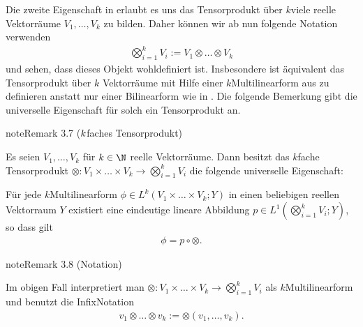 \documentclass[letterpaper,10pt,german]{jupyterBook}
\begin{document}
\sphinxAtStartPar
Die zweite Eigenschaft in {\hyperref[\detokenize{vektoranalysis/tensor:lem:natISO}]{}} erlaubt es uns das Tensorprodukt über \(k\)\sphinxhyphen{}viele reelle Vektorräume \(V_1,\ldots, V_k\) zu bilden.
Daher können wir ab nun folgende Notation verwenden
\begin{equation*}
\begin{split}\bigotimes_{i=1}^k V_i :=V_1\otimes\ldots\otimes V_k\end{split}
\end{equation*}
\sphinxAtStartPar
und sehen, dass dieses Objekt wohldefiniert ist.
Insbesondere ist äquivalent das Tensorprodukt über \(k\) Vektorräume mit Hilfe einer \(k\)\sphinxhyphen{}Multilinearform aus {\hyperref[\detokenize{vektoranalysis/multilinear:s-k-multilinearform}]{}} zu definieren anstatt nur einer Bilinearform wie in {\hyperref[\detokenize{vektoranalysis/tensor:def:tensor}]{}}.
Die folgende Bemerkung gibt die universelle Eigenschaft für solch ein Tensorprodukt an.
\label{vektoranalysis/tensor:rem:kfachesTensorprodukt}
\begin{sphinxadmonition}{note}{Remark 3.7 (\protect\(k\protect\)\sphinxhyphen{}faches Tensorprodukt)}



\sphinxAtStartPar
Es seien \(V_1,\ldots, V_k\) für \(k \in \N\) reelle Vektorräume.
Dann besitzt das \(k\)\sphinxhyphen{}fache Tensorprodukt \(\otimes \colon V_1 \times \ldots \times V_k \rightarrow \bigotimes_{i=1}^k V_i\) die folgende universelle Eigenschaft:

\sphinxAtStartPar
Für jede \(k\)\sphinxhyphen{}Multilinearform \(\phi\in L^k(V_1\times\ldots\times V_k; Y)\) in einen beliebigen reellen Vektorraum \(Y\) existiert eine eindeutige lineare Abbildung
\(p \in L^1(\bigotimes_{i=1}^k V_i; Y)\), so dass gilt
\begin{equation*}
\begin{split}\phi = p \circ \otimes.\end{split}
\end{equation*}\end{sphinxadmonition}
\label{vektoranalysis/tensor:remark-12}
\begin{sphinxadmonition}{note}{Remark 3.8 (Notation)}



\sphinxAtStartPar
Im obigen Fall interpretiert man \(\otimes: V_1\times\ldots\times V_k \rightarrow \bigotimes_{i=1}^k V_i\) als \(k\)\sphinxhyphen{}Multilinearform und benutzt die Infix\sphinxhyphen{}Notation
\begin{equation*}
\begin{split}v_1\otimes\ldots\otimes v_k := \otimes(v_1,\ldots, v_k).\end{split}
\end{equation*}\end{sphinxadmonition}
\end{document}
